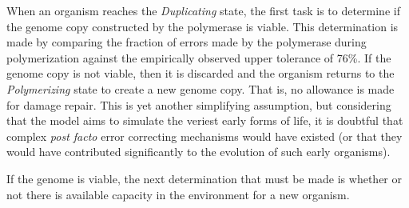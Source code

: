 When an organism reaches the \emph{Duplicating} state, the first task is to determine if the genome copy constructed by the polymerase is viable. This determination is made by comparing the fraction of errors made by the polymerase during polymerization against the empirically observed upper tolerance of 76\%. If the genome copy is not viable, then it is discarded and the organism returns to the \emph{Polymerizing} state to create a new genome copy. That is, no allowance is made for damage repair. This is yet another simplifying assumption, but considering that the model aims to simulate the veriest early forms of life, it is doubtful that complex \emph{post facto} error correcting mechanisms would have existed (or that they would have contributed significantly to the evolution of such early organisms).

If the genome is viable, the next determination that must be made is whether or not there is available capacity in the environment for a new organism.

